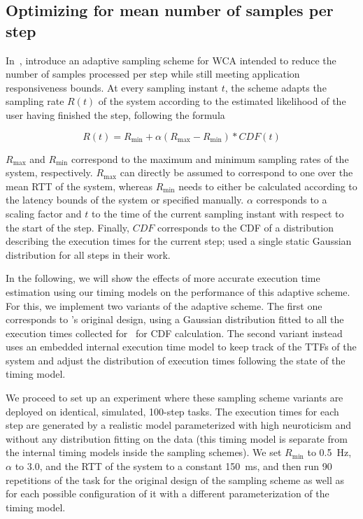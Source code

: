 \subsection{Optimizing for mean number of samples per step}

In~\cite{Wang2019Towards}, \citeauthor{Wang2019Towards} introduce an adaptive sampling scheme for \ac{WCA} intended to reduce the number of samples processed per step while still meeting application responsiveness bounds.
At every sampling instant \( t \), the scheme adapts the sampling rate \( R(t) \) of the system according to the estimated likelihood of the user having finished the step,
following the formula 

\begin{equation}
    R(t) = R_\text{min} + \alpha\left( R_\text{max} - R_\text{min} \right) * CDF(t)
\end{equation}

\( R_\text{max} \) and \( R_\text{min} \) correspond to the maximum and minimum sampling rates of the system, respectively.
\( R_\text{max} \) can directly be assumed to correspond to one over the mean \ac{RTT} of the system, whereas \( R_\text{min} \) needs to either be calculated according to the latency bounds of the system or specified manually.
\( \alpha \) corresponds to a scaling factor and \( t \) to the time of the current sampling instant with respect to the start of the step.
Finally, \( CDF \) corresponds to the \acl*{CDF} of a distribution describing the execution times for the current step; \citeauthor{Wang2019Towards} used a single static Gaussian distribution for all steps in their work.

In the following, we will show the effects of more accurate execution time estimation using our timing models on the performance of this adaptive scheme.
For this, we implement two variants of the adaptive scheme.
The first one corresponds to \citeauthor{Wang2019Towards}'s original design, using a Gaussian distribution fitted to all the execution times collected for~\cite{olguinmunoz:impact2021} for \ac{CDF} calculation.
The second variant instead uses an embedded internal execution time model to keep track of the \acp{TTF} of the system and adjust the distribution of execution times following the state of the timing model.

We proceed to set up an experiment where these sampling scheme variants are deployed on identical, simulated, \num{100}-step tasks.
The execution times for each step are generated by a realistic model parameterized with high neuroticism and without any distribution fitting on the data (this timing model is separate from the internal timing models inside the sampling schemes).
We set \( R_\text{min} \) to \SI{0.5}{\hertz}, \( \alpha \) to \num{3.0}, and the \ac{RTT} of the system to a constant \SI{150}{\milli\second}, and then run \num{90} repetitions of the task for the original design of the sampling scheme as well as for each possible configuration of it with a different parameterization of the timing model.

